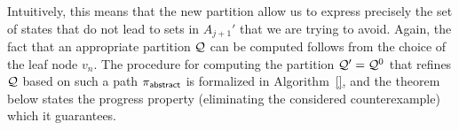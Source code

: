 Intuitively, this means that the new partition allow us to express precisely the set of states that do not lead to sets in $A_{j+1}'$ that we are trying to avoid. Again, the fact that an appropriate partition $\mathcal{Q}$ can be computed follows from the choice of the leaf node $v_n$. The procedure for computing the partition $\mathcal{Q}' = \mathcal{Q}^0$ that refines $\mathcal{Q}$ based on such a path $\pi_{\mathsf{abstract}}$ is formalized in Algorithm~\ref{}, and the theorem below states the progress property (eliminating the considered counterexample) which it guarantees.


\begin{theorem}
\end{theorem}

\begin{example}
\end{example}
